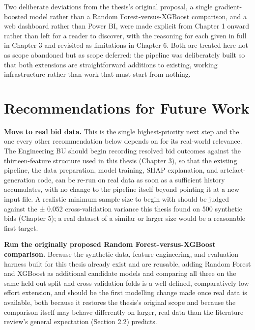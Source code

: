 \documentclass[12pt,oneside]{report}
\begin{document}
Two deliberate deviations from the thesis's original proposal, a single
gradient-boosted model rather than a Random Forest-versus-XGBoost
comparison, and a web dashboard rather than Power BI, were made explicit
from Chapter 1 onward rather than left for a reader to discover, with
the reasoning for each given in full in Chapter 3 and revisited as
limitations in Chapter 6. Both are treated here not as scope abandoned
but as scope deferred: the pipeline was deliberately built so that both
extensions are straightforward additions to existing, working
infrastructure rather than work that must start from nothing.

\hypertarget{recommendations-for-future-work}{%
\section{Recommendations for Future
Work}\label{recommendations-for-future-work}}

\textbf{Move to real bid data.} This is the single highest-priority next
step and the one every other recommendation below depends on for its
real-world relevance. The Engineering BU should begin recording resolved
bid outcomes against the thirteen-feature structure used in this thesis
(Chapter 3), so that the existing pipeline, the data preparation, model
training, SHAP explanation, and artefact-generation code, can be re-run
on real data as soon as a sufficient history accumulates, with no change
to the pipeline itself beyond pointing it at a new input file. A
realistic minimum sample size to begin with should be judged against the
± 0.052 cross-validation variance this thesis found on 500 synthetic
bids (Chapter 5); a real dataset of a similar or larger size would be a
reasonable first target.

\textbf{Run the originally proposed Random Forest-versus-XGBoost
comparison.} Because the synthetic data, feature engineering, and
evaluation harness built for this thesis already exist and are reusable,
adding Random Forest \citep{breiman2001random} and XGBoost
\citep{chen2016xgboost} as additional candidate models and comparing all
three on the same held-out split and cross-validation folds is a
well-defined, comparatively low-effort extension, and should be the
first modelling change made once real data is available, both because it
restores the thesis's original scope and because the comparison itself
may behave differently on larger, real data than the literature review's
general expectation (Section 2.2) predicts.
\end{document}
